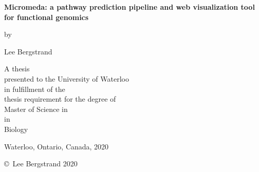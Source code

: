 \pagestyle{empty}

\begin{titlepage}
        \begin{center}
        \vspace*{1.0cm}

        \Huge
        {\bf Micromeda: a pathway prediction pipeline and web visualization tool for functional genomics}

        \vspace*{1.0cm}

        \normalsize
        by \\

        \vspace*{1.0cm}

        \Large
        Lee Bergstrand \\

        \vspace*{3.0cm}

        \normalsize
        A thesis \\
        presented to the University of Waterloo \\ 
        in fulfillment of the \\
        thesis requirement for the degree of \\
        Master of Science in \\
        in \\
        Biology \\

        \vspace*{2.0cm}

        Waterloo, Ontario, Canada, 2020 \\

        \vspace*{1.0cm}

        \copyright\ Lee Bergstrand 2020 \\
        \end{center}
\end{titlepage}

\pagestyle{plain}
\setcounter{page}{2}

